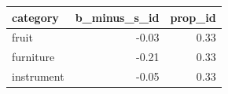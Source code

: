 \begin{table}[ht]
\centering
\begin{tabular}{lrr}
  \hline
category & b\_minus\_s\_id & prop\_id \\ 
  \hline
fruit & -0.03 & 0.33 \\ 
  furniture & -0.21 & 0.33 \\ 
  instrument & -0.05 & 0.33 \\ 
   \hline
\end{tabular}
\end{table}
